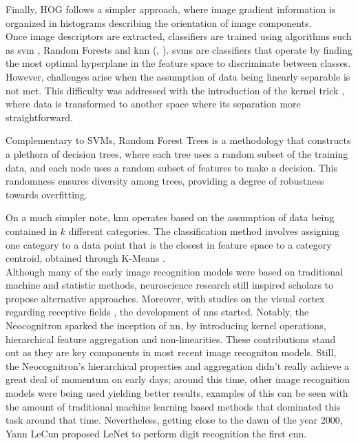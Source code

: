 Finally, HOG follows a simpler approach, where image gradient 
information is organized in histograms describing the orientation of image components. \\ 

Once image descriptors are extracted, classifiers are trained using algorithms such as \gls{svm} 
\autocite{cortes1995support}, Random Forests \autocite{ho1995random} and \gls{knn}
(\cite{cover1967nearest}, \cite{fix1989discriminatory}). \glspl{svm} are classifiers that operate 
by finding the most optimal hyperplane in the feature space to discriminate between classes. 
However, challenges arise when the assumption of data being linearly separable is not met. This 
difficulty was addressed with the introduction of the kernel trick \autocite{hofmann2008kernel}, 
where data is transformed to another space where its separation more straightforward.

Complementary to SVMs, Random Forest Trees is a methodology that constructs a plethora of decision 
trees, where each tree uses a random subset of the training data, and each node uses a random 
subset of features to make a decision. This randomness ensures diversity among trees, providing a 
degree of robustness towards overfitting.

On a much simpler note, \gls{knn} operates based on the assumption of data being contained in 
$k$ different categories. The classification method involves assigning one category to a data 
point that is the closest in feature space to a category centroid, obtained through K-Means 
\autocite{macqueen1967some}.\\

\noindent Although many of the early image recognition models were based on traditional machine 
and statistic methods, neuroscience research still inspired scholars to propose alternative 
approaches. Moreover, with studies on the visual cortex regarding receptive fields 
\autocite{hubel1959receptive}, the development of \glspl{nn} started. Notably, the 
Neocognitron \autocite{fukushima1975cognitron} sparked the inception of  \gls{nn}, by introducing 
kernel operations, hierarchical feature aggregation and non-linearities. These contributions stand 
out as they are key components in most recent image recogniton models.
Still, the Neocognitron's hierarchical properties and aggregation didn't really achieve 
a great deal of momentum on early days; around this time, other image recognition models were being 
used yielding better results, examples of this can be seen with the amount of traditional machine 
learning based methods that dominated this task around that time. Nevertheless, getting close to the 
dawn of the year 2000, Yann LeCun proposed LeNet to perform digit recognition 
\autocite{lecun1998gradient} the first \gls{cnn}.\\

